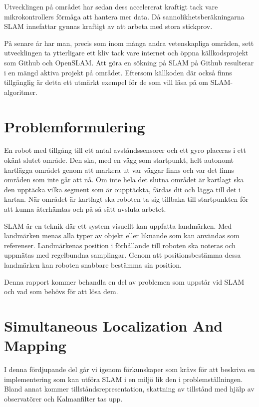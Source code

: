 \documentclass[a4paper,12pt,fleqn]{article}
\begin{document}
Utvecklingen på området har sedan dess accelererat kraftigt tack vare
mikrokontrollers förmåga att hantera mer data. Då sannolikhetsberäkningarna SLAM innefattar gynnas kraftigt av att arbeta med stora stickprov. 

På senare år har man, precis som inom många andra vetenskapliga områden, sett utvecklingen ta ytterligare ett kliv tack vare internet och öppna källkodsprojekt som Github och OpenSLAM. Att göra en sökning på SLAM på Github resulterar i en mängd aktiva projekt på området. Eftersom källkoden där också finns tillgänglig är detta ett utmärkt exempel för de som vill läsa på om SLAM-algoritmer. 


\section{Problemformulering}

En robot med tillgång till ett antal avståndssensorer och ett gyro placeras i ett okänt slutet område. Den ska, med en vägg som startpunkt, helt autonomt kartlägga området genom att markera ut var väggar finns och var det finns områden som inte går att nå. Om inte hela det slutna området är kartlagt ska den upptäcka vilka segment som är oupptäckta, färdas dit och lägga till det i kartan. När området är kartlagt ska roboten ta sig tillbaka till startpunkten för att kunna återhämtas och på så sätt avsluta arbetet. 

SLAM är en teknik där ett system visuellt kan uppfatta landmärken. Med landmärken menas alla typer av objekt eller liknande som kan användas som referenser. Landmärkenas position i förhållande till roboten ska noteras och uppmätas med regelbundna samplingar. Genom att positionsbestämma dessa landmärken kan roboten snabbare bestämma sin position. 

Denna rapport kommer behandla en del av problemen som uppstår vid SLAM och vad som behövs för att lösa dem.


\newpage
\section{Simultaneous Localization And Mapping}
I denna fördjupande del går vi igenom förkunskaper som krävs för att beskriva en implementering som kan utföra SLAM i en miljö lik den i problemställningen. Bland annat kommer tillståndsrepresentation, skattning av tillstånd med hjälp av observatörer och Kalmanfilter tas upp.
\end{document}
